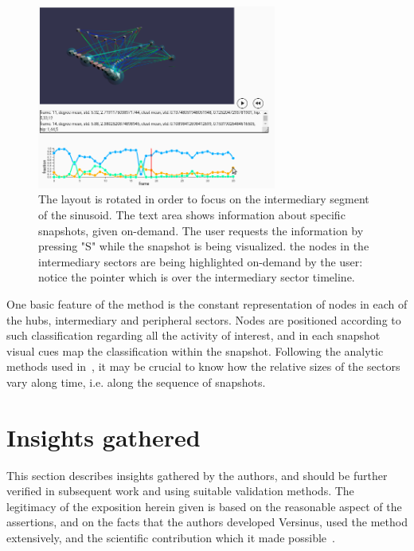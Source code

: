 \documentclass[runningheads]{llncs}
\begin{document}
\begin{figure}[!h]\centering
\includegraphics[width=0.7\textwidth]{esfNetVis4}
  \caption{
  The layout is rotated in order to focus on the intermediary segment of the sinusoid.
  The text area shows information about specific snapshots, given on-demand. The user requests the information by pressing "S" while the snapshot is being visualized.
  the nodes in the intermediary sectors are being highlighted on-demand by the user: notice the pointer which is over the intermediary sector timeline.
  }\label{env4}
\end{figure}
One basic feature of the method is the constant representation of
nodes in each of the hubs, intermediary and peripheral sectors.
Nodes are positioned according to such classification regarding all
the activity of interest, and in each snapshot visual cues map the
classification within the snapshot.
Following the analytic methods used in~\cite{stab}, it may be crucial
to know how the relative sizes of the sectors vary along time, i.e. along
the sequence of snapshots.

\section{Insights gathered}\label{sec:ins}
This section describes insights gathered by the authors,
and should be further verified in subsequent work and using
suitable validation methods.
The legitimacy of the exposition herein given is based on the reasonable aspect of the assertions, and on the facts that the authors developed Versinus, used the method extensively, and the scientific contribution which it made possible~\cite{stab}.
\end{document}
